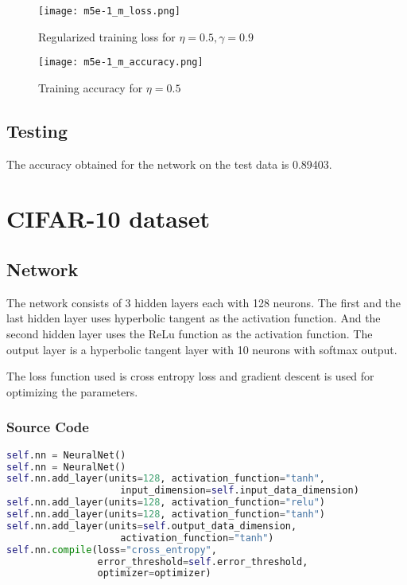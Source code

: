 \documentclass{article}
\begin{document}
\begin{figure}[!ht]
  \texttt{[image: m5e-1\_m\_loss.png]}
  \caption{Regularized training loss for $\eta = 0.5, \gamma = 0.9$}
  \label{fig:mnist_one_loss}
\end{figure}

\begin{figure}[!ht]
  \texttt{[image: m5e-1\_m\_accuracy.png]}
  \caption{Training accuracy for $\eta = 0.5$}
  \label{fig:mnist_one_accuracy}
\end{figure}

\subsection{Testing}
The accuracy obtained for the network on the test data is 0.89403.

\section {CIFAR-10 dataset}
\subsection{Network}
The network consists of 3 hidden layers each with 128 neurons.  The first and the last
hidden layer uses hyperbolic tangent as the activation function. And the second
hidden layer uses the ReLu function as the activation function. The output layer is
a hyperbolic tangent layer with 10 neurons with softmax output.

The loss function used is cross entropy loss and gradient descent is used for
optimizing the parameters.

\subsubsection{Source Code}
\begin{lstlisting}[language=python]
self.nn = NeuralNet()
self.nn = NeuralNet()
self.nn.add_layer(units=128, activation_function="tanh",
                    input_dimension=self.input_data_dimension)
self.nn.add_layer(units=128, activation_function="relu")
self.nn.add_layer(units=128, activation_function="tanh")
self.nn.add_layer(units=self.output_data_dimension,
                    activation_function="tanh")
self.nn.compile(loss="cross_entropy",
                error_threshold=self.error_threshold,
                optimizer=optimizer)
\end{lstlisting}
\end{document}
